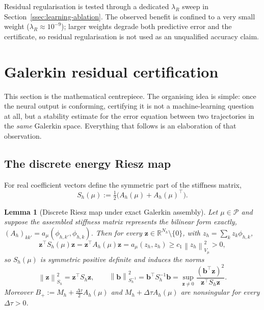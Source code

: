 \documentclass[11pt]{amsart}
\newtheorem{lemma}[theorem]{Lemma}
\theoremstyle{remark}
\newcommand{\R}{\mathbb{R}}
\newcommand{\Pset}{\mathcal{P}}
\newcommand{\Vmu}{V_{\mu}}
\newcommand{\Mh}{M_h}
\newcommand{\Ah}{A_h}
\newcommand{\Sh}{S_h}
\newcommand{\norm}[1]{\left\lVert #1\right\rVert}
\newcommand{\dt}{\Delta\tau}
\newcommand{\bb}{\mathbf b}
\newcommand{\zz}{\mathbf z}
\begin{document}
Residual regularisation is tested through a dedicated
$\lambda_R$ sweep in Section~\ref{ssec:learning-ablation}.  The observed
benefit is confined to a very small weight ($\lambda_R\approx10^{-9}$); larger
weights degrade both predictive error and the certificate, so residual
regularisation is not used as an unqualified accuracy claim.

\section{Galerkin residual certification}
\label{sec:certificate}

This section is the mathematical centrepiece.  The organising idea is simple:
once the neural output is conforming, certifying it is not a machine-learning
question at all, but a stability estimate for the error equation between two
trajectories in the \emph{same} Galerkin space.  Everything that follows is an
elaboration of that observation.

\subsection{The discrete energy Riesz map}
\label{ssec:riesz}

For real coefficient vectors define the symmetric part of the stiffness
matrix,
\begin{equation}
  \Sh(\mu):=\tfrac12\bigl(\Ah(\mu)+\Ah(\mu)^\top\bigr).
  \label{eq:Sh}
\end{equation}

\begin{lemma}[Discrete Riesz map under exact Galerkin assembly]
\label{lem:Sh-spd}
Let $\mu\in\Pset$ and suppose the assembled stiffness matrix represents the
bilinear form exactly, $(\Ah)_{kk'}=a_\mu(\phi_{h,k'},\phi_{h,k})$.  Then for
every $\zz\in\R^{N_h}\setminus\{0\}$, with
$z_h=\sum_kz_k\phi_{h,k}$,
\begin{equation}
  \zz^\top\Sh(\mu)\zz=\zz^\top\Ah(\mu)\zz
  =a_\mu(z_h,z_h)\ge c_1\norm{z_h}_{\Vmu}^2>0,
  \label{eq:Sh-spd}
\end{equation}
so $\Sh(\mu)$ is symmetric positive definite and induces the norms
\begin{equation}
 \norm{\zz}_{\Sh}^2=\zz^\top\Sh\zz,
 \qquad
 \norm{\bb}_{\Sh^{-1}}^2=\bb^\top\Sh^{-1}\bb
 =\sup_{\zz\ne0}\frac{(\bb^\top\zz)^2}{\zz^\top\Sh\zz}.
 \label{eq:discrete-energy-dual}
\end{equation}
Moreover $B_+:=\Mh+\tfrac{\dt}{2}\Ah(\mu)$ and
$\Mh+\dt\Ah(\mu)$ are nonsingular for every $\dt>0$.
\end{lemma}
\end{document}
